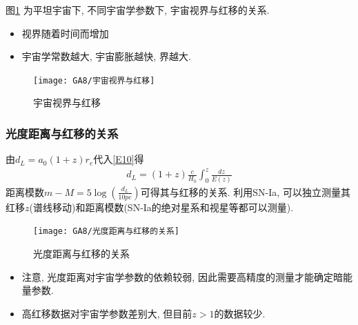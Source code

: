 图\ref{宇宙视界与红移} 为平坦宇宙下, 不同宇宙学参数下, 宇宙视界与红移的关系. 
\begin{itemize}\small
    \item 视界随着时间而增加
    \item 宇宙学常数越大, 宇宙膨胀越快, 界越大. 
\end{itemize}

\begin{figure}[!htb]
    \centering
    \texttt{[image: GA8/宇宙视界与红移]}
    \caption{宇宙视界与红移}
    \label{宇宙视界与红移}
\end{figure}

\subsubsection{光度距离与红移的关系}
由$d_L=a_0(1+z)r_e$代入\ref{E10}得
\begin{align*}
    d_L=(1+z)\frac{c}{H_0}\int_0^z\frac{dz}{E(z)}
\end{align*}
距离模数$m-M=5\log(\frac{d_L}{10pc})$可得其与红移的关系. 利用SN-Ia, 可以独立测量其红移$z$(谱线移动)和距离模数(SN-Ia的绝对星系和视星等都可以测量). 

\begin{figure}[!htb]
    \centering
    \texttt{[image: GA8/光度距离与红移的关系]}
    \caption{光度距离与红移的关系}
\end{figure}
\begin{itemize}\small
    \item 注意, 光度距离对宇宙学参数的依赖较弱, 因此需要高精度的测量才能确定暗能量参数. 
    \item 高红移数据对宇宙学参数差别大, 但目前$z>1$的数据较少. 
\end{itemize}

